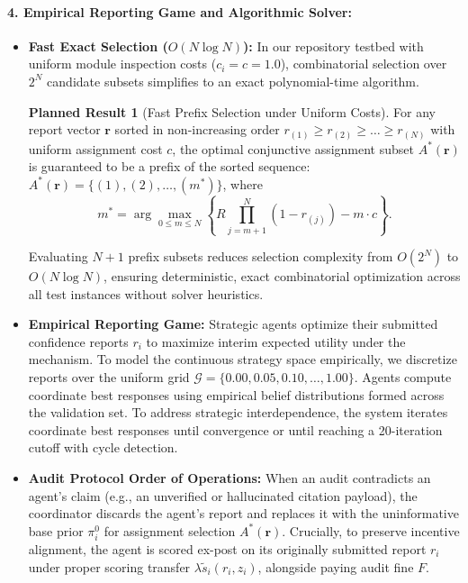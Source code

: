 \documentclass{article}
\theoremstyle{definition}
\newtheorem{plannedresult}{Planned Result}
\begin{document}
\paragraph{4. Empirical Reporting Game and Algorithmic Solver:}
\begin{itemize}
    \item \textbf{Fast Exact Selection ($O(N \log N)$):} In our repository testbed with uniform module inspection costs ($c_i = c = 1.0$), combinatorial selection over $2^N$ candidate subsets simplifies to an exact polynomial-time algorithm. 
    \begin{plannedresult}[Fast Prefix Selection under Uniform Costs]
        For any report vector $\mathbf{r}$ sorted in non-increasing order $r_{(1)} \ge r_{(2)} \ge \dots \ge r_{(N)}$ with uniform assignment cost $c$, the optimal conjunctive assignment subset $A^*(\mathbf{r})$ is guaranteed to be a prefix of the sorted sequence: $A^*(\mathbf{r}) = \{ (1), (2), \dots, (m^*) \}$, where
        \begin{equation}
            m^* = \arg\max_{0 \le m \le N} \left\{ R \prod_{j=m+1}^N (1 - r_{(j)}) - m \cdot c \right\}.
            \label{eq:fast_prefix_selection}
        \end{equation}
    \end{plannedresult}
    Evaluating $N+1$ prefix subsets reduces selection complexity from $O(2^N)$ to $O(N \log N)$, ensuring deterministic, exact combinatorial optimization across all test instances without solver heuristics.
    \item \textbf{Empirical Reporting Game:} Strategic agents optimize their submitted confidence reports $r_i$ to maximize interim expected utility under the mechanism. To model the continuous strategy space empirically, we discretize reports over the uniform grid $\mathcal{G} = \{0.00, 0.05, 0.10, \dots, 1.00\}$. Agents compute coordinate best responses using empirical belief distributions formed across the validation set. To address strategic interdependence, the system iterates coordinate best responses until convergence or until reaching a 20-iteration cutoff with cycle detection.
    \item \textbf{Audit Protocol Order of Operations:} When an audit contradicts an agent's claim (e.g., an unverified or hallucinated citation payload), the coordinator discards the agent's report and replaces it with the uninformative base prior $\pi_i^0$ for assignment selection $A^*(\mathbf{r})$. Crucially, to preserve incentive alignment, the agent is scored ex-post on its originally submitted report $r_i$ under proper scoring transfer $\lambda \tilde{s}_i(r_i, z_i)$, alongside paying audit fine $F$.
\end{itemize}
\end{document}
